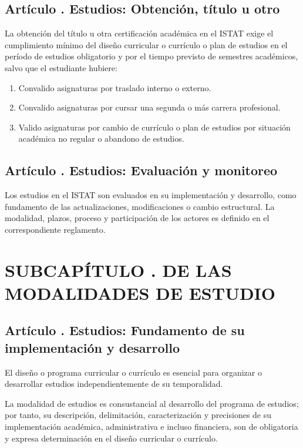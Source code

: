 \subsection{Artículo . Estudios: Obtención, título u otro}
\addtocounter{ns}{1}
La obtención del título u otra certificación académica en el ISTAT exige el cumplimiento mínimo del diseño curricular o currículo o plan de estudios en el período de estudios obligatorio y por el tiempo previsto de semestres académicos, salvo que el estudiante hubiere: 
\begin{enumerate}
\item Convalido asignaturas por traslado interno o externo. 
\item Convalido asignaturas por cursar una segunda o más carrera profesional. 
\item Valido asignaturas por cambio de currículo o plan de estudios por situación académica no regular o abandono de estudios. 
\end{enumerate}
\subsection{Artículo . Estudios: Evaluación y monitoreo}
\addtocounter{ns}{1}
Los estudios en el ISTAT son evaluados en su implementación y desarrollo, como fundamento de las actualizaciones, modificaciones o cambio estructural. La modalidad, plazos, proceso y participación de los actores es definido en el correspondiente reglamento.  
\section{SUBCAPÍTULO . DE LAS MODALIDADES DE ESTUDIO}
\addtocounter{su}{1}

\subsection{Artículo . Estudios: Fundamento de su implementación y desarrollo}
\addtocounter{ns}{1}
El diseño o programa curricular o currículo es esencial para organizar o desarrollar estudios independientemente de su temporalidad.  

La modalidad de estudios es consustancial al desarrollo del programa de estudios; por tanto, su descripción, delimitación, caracterización y precisiones de su implementación académica, administrativa e incluso financiera, son de obligatoria y expresa determinación en el diseño curricular o currículo. 
